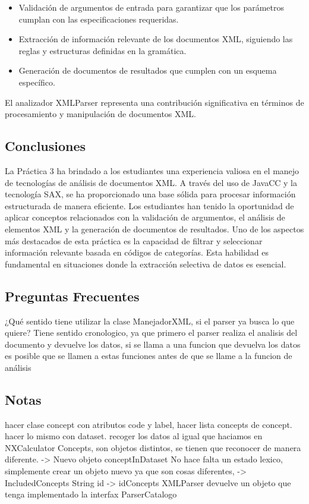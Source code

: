 \begin{itemize}
    \item Validación de argumentos de entrada para garantizar que los parámetros cumplan con las especificaciones requeridas.
    \item Extracción de información relevante de los documentos XML, siguiendo las reglas y estructuras definidas en la gramática.
    \item Generación de documentos de resultados que cumplen con un esquema específico.
\end{itemize}
El analizador XMLParser representa una contribución significativa en términos de procesamiento y manipulación de documentos XML.


\subsection{Conclusiones}

La Práctica 3 ha brindado a los estudiantes una experiencia valiosa en el manejo de tecnologías de análisis de documentos XML. A través del uso de JavaCC y la tecnología SAX, se ha proporcionado una base sólida para procesar información estructurada de manera eficiente. Los estudiantes han tenido la oportunidad de aplicar conceptos relacionados con la validación de argumentos, el análisis de elementos XML y la generación de documentos de resultados.
Uno de los aspectos más destacados de esta práctica es la capacidad de filtrar y seleccionar información relevante basada en códigos de categorías. Esta habilidad es fundamental en situaciones donde la extracción selectiva de datos es esencial.

\subsection{Preguntas Frecuentes}

¿Qué sentido tiene utilizar la clase ManejadorXML, si el parser ya busca lo que quiere?
Tiene sentido cronologico, ya que primero el parser realiza el analisis del documento y devuelve los datos, si se llama a una funcion que devuelva los datos es posible que se llamen a estas funciones antes de que se llame a la funcion de análisis

\subsection{Notas}

hacer clase concept con atributos code y label, hacer lista concepts de concept. hacer lo mismo con dataset. recoger los datos al igual que haciamos en NXCalculator
Concepts, son objetos distintos, se tienen que reconocer de manera diferente. -> Nuevo objeto conceptInDataset
No hace falta un estado lexico, simplemente crear un objeto nuevo ya que son cosas diferentes, -> IncludedConcepts
String id -> idConcepts
XMLParser devuelve un objeto que tenga implementado la interfax ParserCatalogo


